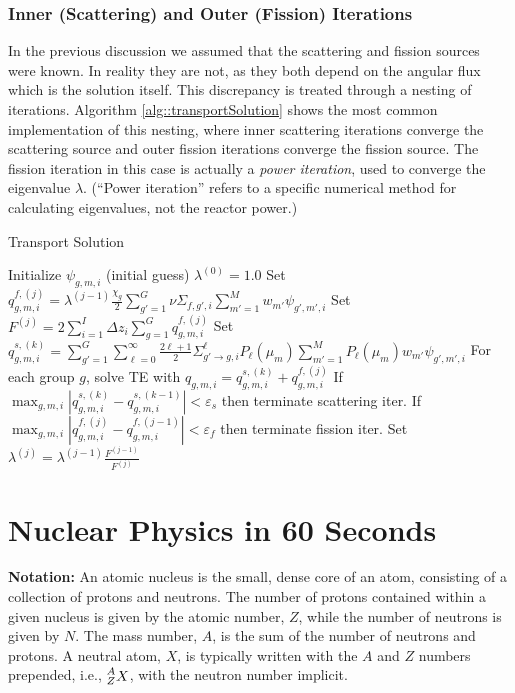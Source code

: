 \documentclass[11pt]{article}
\newcommand\leftidx[3]{{\vphantom{#2}}#1#2#3}
\begin{document}
\subsubsection{Inner (Scattering) and Outer (Fission) Iterations}
\label{sec:orgheadline57}
In the previous discussion we assumed that the scattering and fission sources were known.  In reality they are not, as they both depend on the angular flux which is the solution itself.  This discrepancy is treated through a nesting of iterations.  Algorithm \ref{alg::transportSolution} shows the most common implementation of this nesting, where inner scattering iterations converge the scattering source and outer fission iterations converge the fission source.  The fission iteration in this case is actually a \emph{power iteration}, used to converge the eigenvalue \(\lambda\).  (``Power iteration'' refers to a specific numerical method for calculating eigenvalues, not the reactor power.)

\begin{algorithm}
\caption{Transport Solution}
\label{alg::transportSolution}
\begin{algorithmic}[1]
  \State Initialize $\psi_{g,m,i}$ (initial guess)
  \State $\lambda^{(0)} = 1.0$
   
    \State Set $q_{g,m,i}^{f,(j)} = \lambda^{(j-1)}\frac{\chi_g}{2} \sum_{g'=1}^G \nu\Sigma_{f,g',i} \sum_{m'=1}^M w_{m'} \psi_{g',m',i}$
    \State Set $F^(j) = 2 \sum_{i=1}^I \Delta z _i \sum_{g=1}^G q_{g,m,i}^{f,(j)}$
     
      \State Set $q_{g,m,i}^{s,(k)} = \sum_{g'=1}^G \sum_{\ell=0}^\infty \frac{2\ell+1}{2} \Sigma_{g' \rightarrow g,i}^\ell P_\ell(\mu_m) \sum_{m'=1}^M P_\ell(\mu_m) w_{m'} \psi_{g',m',i}$
      \State For each group $g$, solve TE with $q_{g,m,i} = q_{g,m,i}^{s,(k)} + q_{g,m,i}^{f,(j)}$
      \State If $\max_{g,m,i} \left| q_{g,m,i}^{s,(k)} - q_{g,m,i}^{s,(k-1)} \right| < \varepsilon_s$ then terminate scattering iter.
    \EndFor
    \State If $\max_{g,m,i} \left| q_{g,m,i}^{f,(j)} - q_{g,m,i}^{f,(j-1)} \right| < \varepsilon_f$ then terminate fission iter.
    \State Set $\lambda^{(j)} = \lambda^{(j-1)} \frac{F^{(j-1)}}{F^{(j)}}$
  \EndFor
\end{algorithmic}
\end{algorithm}
\section{Nuclear Physics in 60 Seconds}
\label{sec:orgheadline60}
\textbf{Notation:} An atomic nucleus is the small, dense core of an atom, consisting of a collection of protons and neutrons.  The number of protons contained within a given nucleus is given by the atomic number, \(Z\), while the number of neutrons is given by \(N\).  The mass number, \(A\), is the sum of the number of neutrons and protons.  A neutral atom, \(X\), is typically written with the \(A\) and \(Z\) numbers prepended, i.e., \(\leftidx{^A_Z}{X}{}\), with the neutron number implicit.
\end{document}
